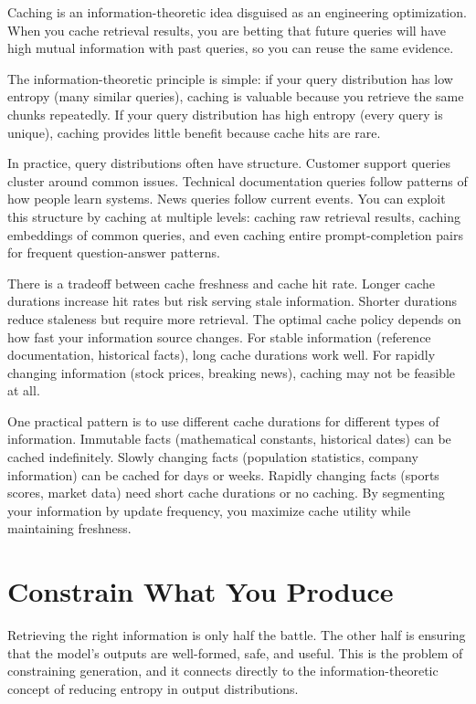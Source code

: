 Caching is an information-theoretic idea disguised as an engineering optimization. When you cache retrieval results, you are betting that future queries will have high mutual information with past queries, so you can reuse the same evidence.

The information-theoretic principle is simple: if your query distribution has low entropy (many similar queries), caching is valuable because you retrieve the same chunks repeatedly. If your query distribution has high entropy (every query is unique), caching provides little benefit because cache hits are rare.

In practice, query distributions often have structure. Customer support queries cluster around common issues. Technical documentation queries follow patterns of how people learn systems. News queries follow current events. You can exploit this structure by caching at multiple levels: caching raw retrieval results, caching embeddings of common queries, and even caching entire prompt-completion pairs for frequent question-answer patterns.

There is a tradeoff between cache freshness and cache hit rate. Longer cache durations increase hit rates but risk serving stale information. Shorter durations reduce staleness but require more retrieval. The optimal cache policy depends on how fast your information source changes. For stable information (reference documentation, historical facts), long cache durations work well. For rapidly changing information (stock prices, breaking news), caching may not be feasible at all.

One practical pattern is to use different cache durations for different types of information. Immutable facts (mathematical constants, historical dates) can be cached indefinitely. Slowly changing facts (population statistics, company information) can be cached for days or weeks. Rapidly changing facts (sports scores, market data) need short cache durations or no caching. By segmenting your information by update frequency, you maximize cache utility while maintaining freshness.

\vspace{2em}

\section{Constrain What You Produce}

Retrieving the right information is only half the battle. The other half is ensuring that the model's outputs are well-formed, safe, and useful. This is the problem of constraining generation, and it connects directly to the information-theoretic concept of reducing entropy in output distributions.

